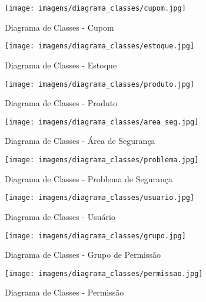 \begin{figure}[!htb]
	\centering
	\texttt{[image: imagens/diagrama\_classes/cupom.jpg]}
	\caption{Diagrama de Classes - Cupom}
\end{figure}

\begin{figure}[!htb]
	\centering
	\texttt{[image: imagens/diagrama\_classes/estoque.jpg]}
	\caption{Diagrama de Classes - Estoque}
\end{figure}

\begin{figure}[!htb]
	\centering
	\texttt{[image: imagens/diagrama\_classes/produto.jpg]}
	\caption{Diagrama de Classes - Produto}
\end{figure}

\begin{figure}[!htb]
	\centering
	\texttt{[image: imagens/diagrama\_classes/area\_seg.jpg]}
	\caption{Diagrama de Classes - Área de Segurança}
\end{figure}

\begin{figure}[!htb]
	\centering
	\texttt{[image: imagens/diagrama\_classes/problema.jpg]}
	\caption{Diagrama de Classes - Problema de Segurança}
\end{figure}

\begin{figure}[!htb]
	\centering
	\texttt{[image: imagens/diagrama\_classes/usuario.jpg]}
	\caption{Diagrama de Classes - Usuário}
\end{figure}

\begin{figure}[!htb]
	\centering
	\texttt{[image: imagens/diagrama\_classes/grupo.jpg]}
	\caption{Diagrama de Classes - Grupo de Permissão}
\end{figure}

\begin{figure}[!htb]
	\centering
	\texttt{[image: imagens/diagrama\_classes/permissao.jpg]}
	\caption{Diagrama de Classes - Permissão}
\end{figure}